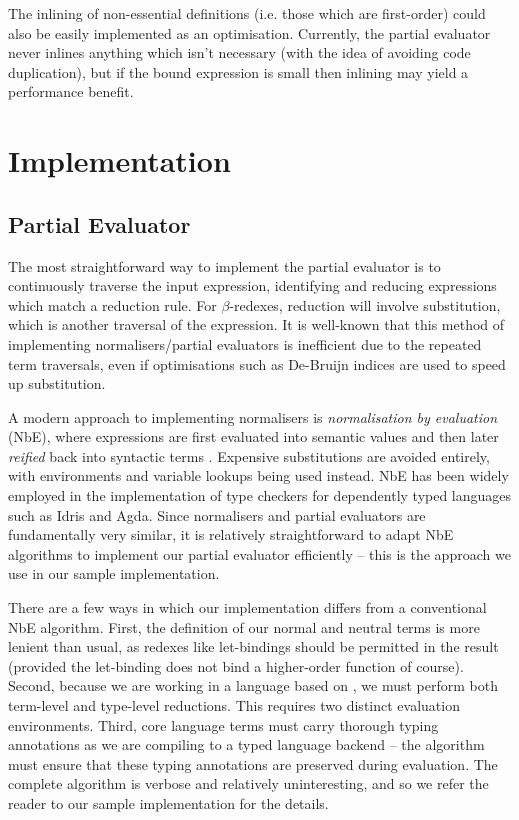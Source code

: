 \documentclass[runningheads]{llncs}
\begin{document}
The inlining of non-essential definitions (i.e. those which are first-order) could also be easily implemented as an optimisation. Currently, the partial evaluator never inlines anything which isn't necessary (with the idea of avoiding code duplication), but if the bound expression is small then inlining may yield a performance benefit.

\section{Implementation}


\subsection{Partial Evaluator}

The most straightforward way to implement the partial evaluator is to continuously traverse the input expression, identifying and reducing expressions which match a reduction rule. For $\beta$-redexes, reduction will involve substitution, which is another traversal of the expression. It is well-known that this method of implementing normalisers/partial evaluators is inefficient due to the repeated term traversals, even if optimisations such as De-Bruijn indices \cite{berghofer2007head} are used to speed up substitution.

A modern approach to implementing normalisers is \emph{normalisation by evaluation} (NbE), where expressions are first evaluated into semantic values and then later \emph{reified} back into syntactic terms \cite{abel2014normalization, berger1998normalization}. Expensive substitutions are avoided entirely, with environments and variable lookups being used instead. NbE has been widely employed in the implementation of type checkers for dependently typed languages such as Idris and Agda. Since normalisers and partial evaluators are fundamentally very similar, it is relatively straightforward to adapt NbE algorithms to implement our partial evaluator efficiently -- this is the approach we use in our sample implementation.  

There are a few ways in which our implementation differs from a conventional NbE algorithm. First, the definition of our normal and neutral terms is more lenient than usual, as redexes like let-bindings should be permitted in the result (provided the let-binding does not bind a higher-order function of course). Second, because we are working in a language based on \fom{}, we must perform both term-level and type-level reductions. This requires two distinct evaluation environments. Third, core language terms must carry thorough typing annotations as we are compiling to a typed language backend -- the algorithm must ensure that these typing annotations are preserved during evaluation. The complete algorithm is verbose and relatively uninteresting, and so we refer the reader to our sample implementation for the details.
\end{document}
